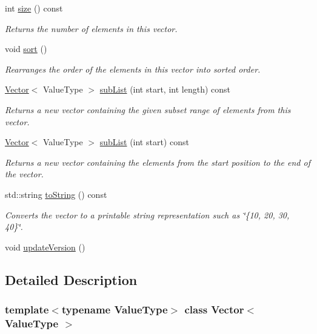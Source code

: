 \begin{DoxyCompactItemize}
int \mbox{\hyperlink{classVector_af9593d4a5ff4274efaf429cb4f9e57cc}{size}} () const
\begin{DoxyCompactList}\small\item\em Returns the number of elements in this vector. \end{DoxyCompactList}\item 
void \mbox{\hyperlink{classVector_a47fdc9eea42b6975cdc835bb2e08810e}{sort}} ()
\begin{DoxyCompactList}\small\item\em Rearranges the order of the elements in this vector into sorted order. \end{DoxyCompactList}\item 
\mbox{\hyperlink{classVector}{Vector}}$<$ Value\+Type $>$ \mbox{\hyperlink{classVector_a68d5113d5e35ad7906cb7d1707621e08}{sub\+List}} (int start, int length) const
\begin{DoxyCompactList}\small\item\em Returns a new vector containing the given subset range of elements from this vector. \end{DoxyCompactList}\item 
\mbox{\hyperlink{classVector}{Vector}}$<$ Value\+Type $>$ \mbox{\hyperlink{classVector_ae03d3b2b1d798ec0490b8adc2ff1abd0}{sub\+List}} (int start) const
\begin{DoxyCompactList}\small\item\em Returns a new vector containing the elements from the start position to the end of the vector. \end{DoxyCompactList}\item 
std\+::string \mbox{\hyperlink{classVector_a1fe5121d6528fdea3f243321b3fa3a49}{to\+String}} () const
\begin{DoxyCompactList}\small\item\em Converts the vector to a printable string representation such as \char`\"{}\{10, 20, 30, 40\}\char`\"{}. \end{DoxyCompactList}\item 
void \mbox{\hyperlink{classVector_ad1aea0de96f7197055bac8bf8aba7f32}{update\+Version}} ()
\end{DoxyCompactItemize}


\subsection{Detailed Description}
\subsubsection*{template$<$typename Value\+Type$>$\newline
class Vector$<$ Value\+Type $>$}

